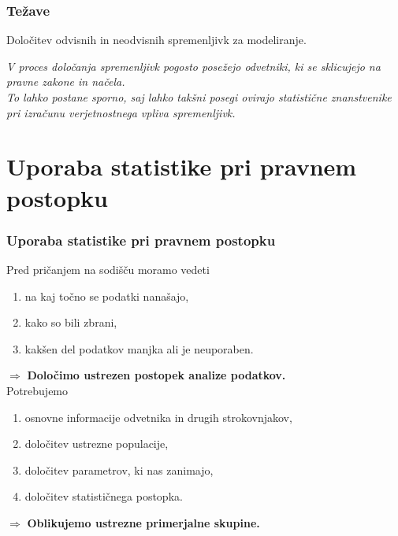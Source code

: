 \documentclass{beamer}
\begin{document}
\begin{frame}
    \frametitle{Težave}
    \begin{block}{}
        \centering
        Določitev odvisnih in neodvisnih spremenljivk za modeliranje.
    \end{block}\vspace{3mm}
    \textit{
    V proces določanja spremenljivk pogosto posežejo odvetniki, ki se sklicujejo na pravne zakone in načela. \\
    To lahko postane sporno, saj lahko takšni posegi ovirajo statistične znanstvenike pri izračunu verjetnostnega vpliva spremenljivk.}
\end{frame}

\section{Uporaba statistike pri pravnem postopku}

\begin{frame}
    \frametitle{Uporaba statistike pri pravnem postopku}
    Pred pričanjem na sodišču moramo vedeti
    \begin{enumerate}
        \item na kaj točno se podatki nanašajo,
        \item kako so bili zbrani,
        \item kakšen del podatkov manjka ali je neuporaben.
    \end{enumerate}
    $\Rightarrow$ \textbf{Določimo ustrezen postopek analize podatkov.}\\ \vspace{3mm}
    Potrebujemo
    \begin{enumerate}
        \item osnovne informacije odvetnika in drugih strokovnjakov,
        \item določitev ustrezne populacije,
        \item določitev parametrov, ki nas zanimajo,
        \item določitev statističnega postopka.
    \end{enumerate}
    $\Rightarrow$ \textbf{Oblikujemo ustrezne primerjalne skupine.}
\end{frame}
\end{document}
